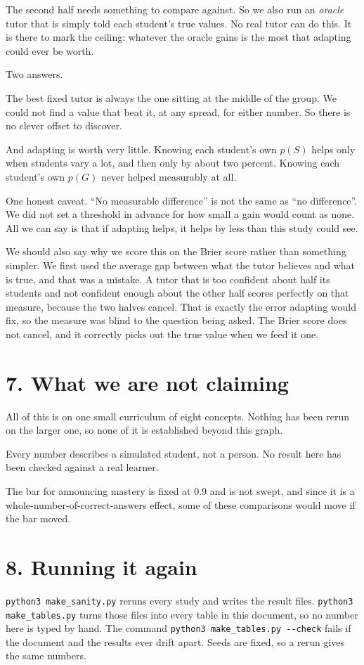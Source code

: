 \documentclass[11pt]{article}
\newcommand{\code}[1]{\texttt{\small #1}}
\begin{document}
The second half needs something to compare against. So we also run an
\emph{oracle} tutor that is simply told each student's true values. No
real tutor can do this. It is there to mark the ceiling: whatever the
oracle gains is the most that adapting could ever be worth.



\noindent Two answers.

The best fixed tutor is always the one sitting at the middle of the group.
We could not find a value that beat it, at any spread, for either number.
So there is no clever offset to discover.

And adapting is worth very little. Knowing each student's own $p(S)$ helps
only when students vary a lot, and then only by about two percent. Knowing
each student's own $p(G)$ never helped measurably at all.

One honest caveat. ``No measurable difference'' is not the same as ``no
difference''. We did not set a threshold in advance for how small a gain
would count as none. All we can say is that if adapting helps, it helps by
less than this study could see.

We should also say why we score this on the Brier score rather than
something simpler. We first used the average gap between what the tutor
believes and what is true, and that was a mistake. A tutor that is too
confident about half its students and not confident enough about the other
half scores perfectly on that measure, because the two halves cancel. That
is exactly the error adapting would fix, so the measure was blind to the
question being asked. The Brier score does not cancel, and it correctly
picks out the true value when we feed it one.

\section*{7. What we are not claiming}

All of this is on one small curriculum of eight concepts. Nothing has been
rerun on the larger one, so none of it is established beyond this graph.

Every number describes a simulated student, not a person. No result here
has been checked against a real learner.

The bar for announcing mastery is fixed at 0.9 and is not swept, and since
it is a whole-number-of-correct-answers effect, some of these comparisons
would move if the bar moved.

\section*{8. Running it again}

\code{python3 make\_sanity.py} reruns every study and writes the result
files. \code{python3 make\_tables.py} turns those files into every table in
this document, so no number here is typed by hand.
The command \code{python3 make\_tables.py -{}-check} fails if the document
and the results ever drift apart. Seeds are fixed, so a rerun gives the
same numbers.
\end{document}
